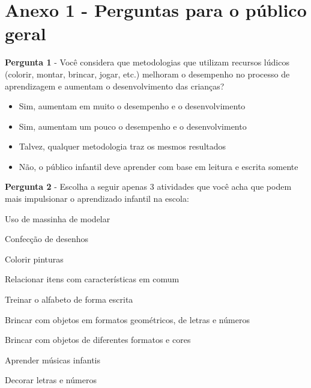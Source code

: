 \documentclass[article,12pt,openany,oneside,a4paper,english,brazil]{abntex2}
\begin{document}


\section{Anexo 1 - Perguntas para o público geral}
\label{sc:anexo1}

\textbf{Pergunta 1} - Você considera que metodologias que utilizam recursos lúdicos (colorir, montar, brincar, jogar, etc.) melhoram o desempenho no processo de aprendizagem e aumentam o desenvolvimento das crianças?
\begin{itemize}
     \item Sim, aumentam em muito o desempenho e o desenvolvimento
     \item Sim, aumentam um pouco o desempenho e o desenvolvimento
     \item Talvez, qualquer metodologia traz os mesmos resultados
     \item Não, o público infantil deve aprender com base em leitura e escrita somente
\end{itemize}

\textbf{Pergunta 2} - Escolha a seguir apenas 3 atividades que você acha que podem mais impulsionar o aprendizado infantil na escola:
\begin{todolist}
     \item Uso de massinha de modelar
     \item Confecção de desenhos
     \item Colorir pinturas
     \item Relacionar itens com características em comum
     \item Treinar o alfabeto de forma escrita
     \item Brincar com objetos em formatos geométricos, de letras e números
     \item Brincar com objetos de diferentes formatos e cores
     \item Aprender músicas infantis
     \item Decorar letras e números
\end{todolist}
\end{document}

